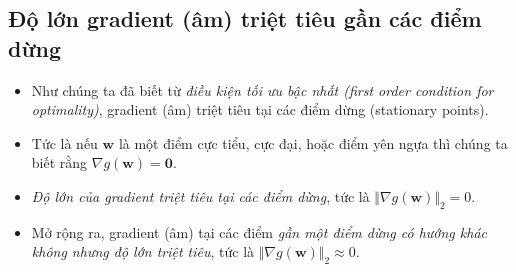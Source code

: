\documentclass{book}
\begin{document}
\subsection{Độ lớn gradient (âm) triệt tiêu gần các điểm dừng}
\begin{itemize}
    \item Như chúng ta đã biết từ \textit{điều kiện tối ưu bậc nhất (first order condition for optimality)}, gradient (âm) triệt tiêu tại các điểm dừng (stationary points). 
    \item Tức là nếu $\mathbf{w}$ là một điểm cực tiểu, cực đại, hoặc điểm yên ngựa thì chúng ta biết rằng $\nabla g\left(\mathbf{w}\right) = \mathbf{0}$.  
    \item \textit{Độ lớn của gradient triệt tiêu tại các điểm dừng}, tức là $\Vert \nabla g \left(\mathbf{w}\right) \Vert_2 = 0$.
    \item Mở rộng ra, gradient (âm) tại các điểm \textit{gần một điểm dừng có hướng khác không nhưng độ lớn triệt tiêu}, tức là $\Vert \nabla g \left(\mathbf{w}\right) \Vert_2 \approx 0$.
\end{itemize}
\end{document}
